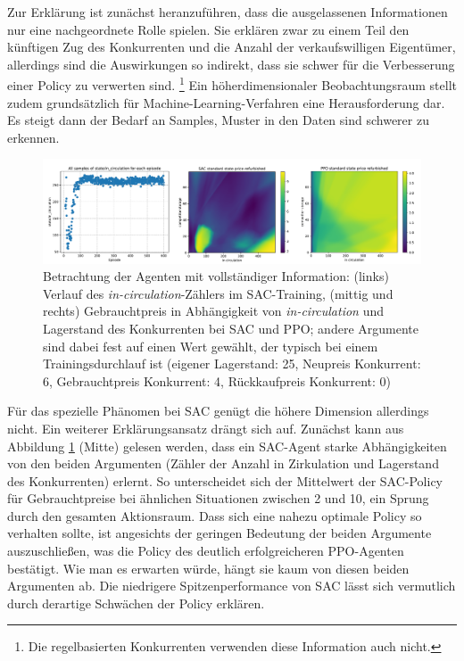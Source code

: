 Zur Erklärung ist zunächst heranzuführen, dass die ausgelassenen Informationen nur eine nachgeordnete Rolle spielen.
Sie erklären zwar zu einem Teil den künftigen Zug des Konkurrenten und die Anzahl der verkaufswilligen Eigentümer, allerdings sind die Auswirkungen so indirekt, dass sie schwer für die Verbesserung einer Policy zu verwerten sind. \footnote{Die regelbasierten Konkurrenten verwenden diese Information auch nicht.}
Ein höherdimensionaler Beobachtungsraum stellt zudem grundsätzlich für Machine-Learning-Verfahren eine Herausforderung dar.
Es steigt dann der Bedarf an Samples, Muster in den Daten sind schwerer zu erkennen.

\begin{figure}[htb]
	\centering
	\includegraphics[width=\textwidth]{main/sac_in_circulation_dependend_explanation.pdf}
	\caption{Betrachtung der Agenten mit vollständiger Information: (links) Verlauf des \textit{in-circulation}-Zählers im SAC-Training, (mittig und rechts) Gebrauchtpreis in Abhängigkeit von \textit{in-circulation} und Lagerstand des Konkurrenten bei SAC und PPO; andere Argumente sind dabei fest auf einen Wert gewählt, der typisch bei einem Trainingsdurchlauf ist (eigener Lagerstand: 25, Neupreis Konkurrent: 6, Gebrauchtpreis Konkurrent: 4, Rückkaufpreis Konkurrent: 0)}
	\label{graphic:InCirculationExplain}
\end{figure}
Für das spezielle Phänomen bei SAC genügt die höhere Dimension allerdings nicht.
Ein weiterer Erklärungsansatz drängt sich auf.
Zunächst kann aus Abbildung \ref{graphic:InCirculationExplain} (Mitte) gelesen werden, dass ein SAC-Agent starke Abhängigkeiten von den beiden Argumenten (Zähler der Anzahl in Zirkulation und Lagerstand des Konkurrenten) erlernt.
So unterscheidet sich der Mittelwert der SAC-Policy für Gebrauchtpreise bei ähnlichen Situationen zwischen 2 und 10, ein Sprung durch den gesamten Aktionsraum.
Dass sich eine nahezu optimale Policy so verhalten sollte, ist angesichts der geringen Bedeutung der beiden Argumente auszuschließen, was die Policy des deutlich erfolgreicheren PPO-Agenten bestätigt.
Wie man es erwarten würde, hängt sie kaum von diesen beiden Argumenten ab.
Die niedrigere Spitzenperformance von SAC lässt sich vermutlich durch derartige Schwächen der Policy erklären.
